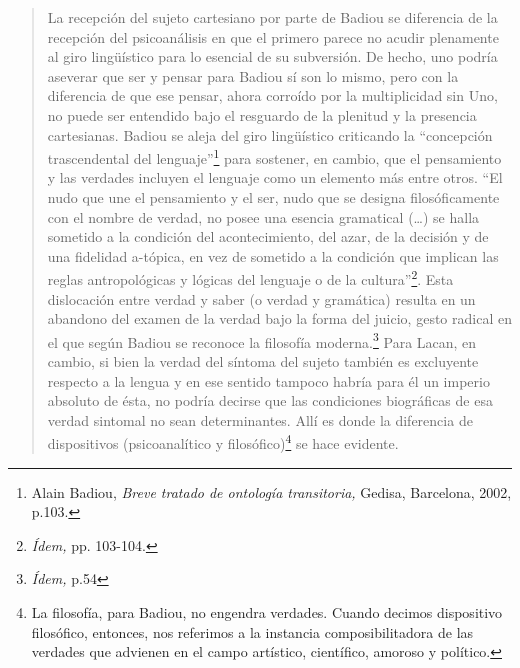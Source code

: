 \begin{quote}
La recepción del sujeto cartesiano por parte de Badiou se diferencia de la recepción del psicoanálisis en que el primero parece no acudir plenamente al giro lingüístico para lo esencial de su subversión. De hecho, uno podría aseverar que ser y pensar para Badiou sí son lo mismo, pero con la diferencia de que ese pensar, ahora corroído por la multiplicidad sin Uno, no puede ser entendido bajo el resguardo de la plenitud y la presencia cartesianas. Badiou se aleja del giro lingüístico criticando la \enquote{concepción trascendental del lenguaje}\footnote{Alain Badiou, \emph{Breve tratado de ontología transitoria,} Gedisa, Barcelona, 2002, p.103.} para sostener, en cambio, que el pensamiento y las verdades incluyen el lenguaje como un elemento más entre otros. \enquote{El nudo que une el pensamiento y el ser, nudo que se designa filosóficamente con el nombre de verdad, no posee una esencia gramatical (\dots) se halla sometido a la condición del acontecimiento, del azar, de la decisión y de una fidelidad a-tópica, en vez de sometido a la condición que implican las reglas antropológicas y lógicas del lenguaje o de la cultura}\footnote{\emph{Ídem,} pp. 103-104.}. Esta dislocación entre verdad y saber (o verdad y gramática) resulta en un abandono del examen de la verdad bajo la forma del juicio, gesto radical en el que según Badiou se reconoce la filosofía moderna.\footnote{\emph{Ídem,} p.54} Para Lacan, en cambio, si bien la verdad del síntoma del sujeto también es excluyente respecto a la lengua y en ese sentido tampoco habría para él un imperio absoluto de ésta, no podría decirse que las condiciones biográficas de esa verdad sintomal no sean determinantes. Allí es donde la diferencia de dispositivos (psicoanalítico y filosófico)\footnote{La filosofía, para Badiou, no engendra verdades. Cuando decimos dispositivo filosófico, entonces, nos referimos a la instancia composibilitadora de las verdades que advienen en el campo artístico, científico, amoroso y político.} se hace evidente.


\end{quote}
